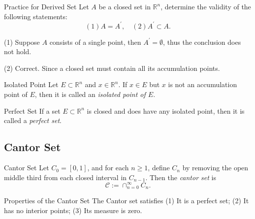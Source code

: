 \begin{example}{Practice for Derived Set}{}
  Let $A$ be a closed set in $\mathbb{R}^n$,
  determine the validity of the following statements:
  \begin{equation}
    (1) A = A^{\prime}, \quad
    (2) A^{\prime} \subset A.
  \end{equation}
\end{example}

\begin{solution}
  (1) Suppose $A$ consists of a single point,
  then $A^{\prime} = \emptyset$, thus the conclusion does not hold.

  (2) Correct. Since a closed set must contain all its accumulation points.
\end{solution}

\begin{definition}{Isolated Point}{}
  Let $E \subset \mathbb{R}^n$ and $x \in \mathbb{R}^n$.
  If $x \in E$ but $x$ is not an accumulation point of $E$,
  then it is called an \emph{isolated point of $E$}.
\end{definition}

\begin{definition}{Perfect Set}{}
  If a set $E \subset \mathbb{R}^n$ is closed and does have any isolated point,
  then it is called a \emph{perfect set}.
\end{definition}

\subsection{Cantor Set}

\begin{definition}{Cantor Set}{}
  Let $C_0 = [0, 1]$, and for each $n \geq 1$, define $C_n$ by removing the open
  middle third from each closed interval in $C_{n-1}$.
  Then the \emph{cantor set} is
  \begin{equation}
    \mathcal{C} := \cap _{n = 0}^{\infty}C_n.
  \end{equation}
\end{definition}

\begin{proposition}{Properties of the Cantor Set}{}
  The Cantor set satisfies
  (1) It is a perfect set;
  (2) It has no interior points;
  (3) Its measure is zero.
\end{proposition}


